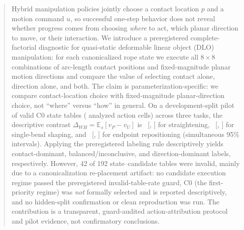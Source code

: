 \documentclass{article}
\begin{document}
\printAffiliationsAndNotice{}

\begin{abstract}
Hybrid manipulation policies jointly choose a contact location $p$ and a
motion command $u$, so successful one-step behavior does not reveal whether
progress comes from choosing \emph{where} to act, which planar direction to
move, or their interaction. We introduce a preregistered complete-factorial
diagnostic for quasi-static deformable linear object (DLO) manipulation: for
each canonicalized rope state we execute all $8{\times}8$ combinations of
arc-length contact positions and fixed-magnitude planar motion directions and
compare the value of selecting contact alone, direction alone, and both. The
claim is parameterization-specific: we compare contact-location choice with
fixed-magnitude planar-direction choice, not ``where'' versus ``how'' in
general. On a development-split pilot of \nstatestotal{} valid C0 state tables
(\ncellstotal{} analyzed action cells) across three tasks, the descriptive
contrast $\Delta_{WH}=\mathbb{E}_s[v_P-v_U]$ is \dwhA~[\dwhAlo, \dwhAhi] for
straightening, \dwhB~[\dwhBlo, \dwhBhi] for single-bend shaping, and
\dwhC~[\dwhClo, \dwhChi] for endpoint repositioning (simultaneous 95\%
intervals). Applying the preregistered labeling rule descriptively yields
contact-dominant, balanced/inconclusive, and direction-dominant labels,
respectively. However, 42 of 192 state--candidate tables were invalid, mainly
due to a canonicalization re-placement artifact: no candidate execution
regime passed the preregistered invalid-table-rate guard, C0 (the
first-priority regime) was \emph{not} formally selected and is reported
descriptively, and no hidden-split confirmation or clean reproduction was
run. The contribution is a transparent, guard-audited action-attribution
protocol and pilot evidence, not confirmatory conclusions.
\end{abstract}
\end{document}
